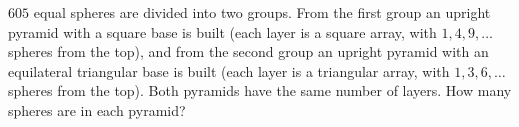 $605$ equal spheres are divided into two groups. From the first group an upright pyramid with a square base is built (each layer is a square array, with $1,4,9,\dots$ spheres from the top), and from the second group an upright pyramid with an equilateral triangular base is built (each layer is a triangular array, with $1,3,6,\dots$ spheres from the top). Both pyramids have the same number of layers. How many spheres are in each pyramid?
